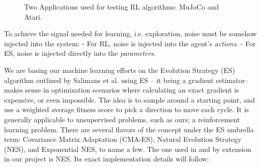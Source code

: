 \begin{figure}[H]
    \centering
    \hfill
    \caption{Two Applications used for testing RL algorithms: MuJoCo and Atari.}
    \label{fig:rl}
\end{figure} 

To achieve the signal needed for learning, i.e. exploration, noise must be somehow injected into the system:
- For RL, noise is injected into the agent's \emph{actions}.
- For ES, noise is injected directly into the \emph{parameters}.

We are basing our machine learning efforts on the Evolution Strategy (ES) algorithm outlined by Salimans et al. \cite{Salimans2017} using ES -- it being a gradient estimator--makes sense in optimization scenarios where calculating an exact gradient is expensive, or even impossible. The idea is to sample around a starting point, and use a weighted average fitness score to pick a direction to move each cycle. It is generally applicable to unsupervised problems, such as ours; a reinforcement learning problem. There are several flavors of the concept under the ES umbrella term: Covariance Matrix Adaptation (CMA-ES), Natural Evolution Strategy (NES), and Exponential NES, to name a few. The one used in \cite{Salimans2017} and by extension in our project is NES. Its exact implementation details will follow:

